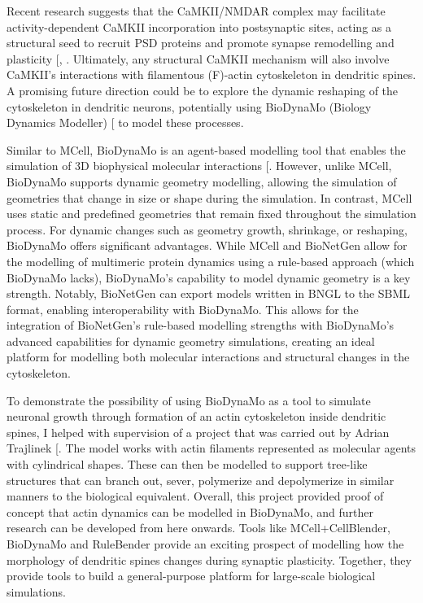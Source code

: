 \documentclass[
  11pt,
  letterpaper,
]{scrreprt}
\begin{document}
Recent research suggests that the CaMKII/NMDAR complex may facilitate
activity-dependent CaMKII incorporation into postsynaptic sites, acting
as a structural seed to recruit PSD proteins and promote synapse
remodelling and plasticity {[},
\citeproc{ref-kim2016Interplay}{220}{]}. Ultimately, any structural
CaMKII mechanism will also involve CaMKII's interactions with
filamentous (F)-actin cytoskeleton in dendritic spines. A promising
future direction could be to explore the dynamic reshaping of the
cytoskeleton in dendritic neurons, potentially using BioDynaMo (Biology
Dynamics Modeller) {[}\citeproc{ref-breitwieser2021BioDynaMo}{477}{]} to
model these processes.

Similar to MCell, BioDynaMo is an agent-based modelling tool that
enables the simulation of 3D biophysical molecular interactions
{[}\citeproc{ref-breitwieser2021BioDynaMo}{477}{]}. However, unlike
MCell, BioDynaMo supports dynamic geometry modelling, allowing the
simulation of geometries that change in size or shape during the
simulation. In contrast, MCell uses static and predefined geometries
that remain fixed throughout the simulation process. For dynamic changes
such as geometry growth, shrinkage, or reshaping, BioDynaMo offers
significant advantages. While MCell and BioNetGen allow for the
modelling of multimeric protein dynamics using a rule-based approach
(which BioDynaMo lacks), BioDynaMo's capability to model dynamic
geometry is a key strength. Notably, BioNetGen can export models written
in BNGL to the SBML format, enabling interoperability with BioDynaMo.
This allows for the integration of BioNetGen's rule-based modelling
strengths with BioDynaMo's advanced capabilities for dynamic geometry
simulations, creating an ideal platform for modelling both molecular
interactions and structural changes in the cytoskeleton.

To demonstrate the possibility of using BioDynaMo as a tool to simulate
neuronal growth through formation of an actin cytoskeleton inside
dendritic spines, I helped with supervision of a project that was
carried out by Adrian Trajlinek
{[}\citeproc{ref-trajlinek2022How}{478}{]}. The model works with actin
filaments represented as molecular agents with cylindrical shapes. These
can then be modelled to support tree-like structures that can branch
out, sever, polymerize and depolymerize in similar manners to the
biological equivalent. Overall, this project provided proof of concept
that actin dynamics can be modelled in BioDynaMo, and further research
can be developed from here onwards. Tools like MCell+CellBlender,
BioDynaMo and RuleBender provide an exciting prospect of modelling how
the morphology of dendritic spines changes during synaptic plasticity.
Together, they provide tools to build a general-purpose platform for
large-scale biological simulations.
\end{document}
